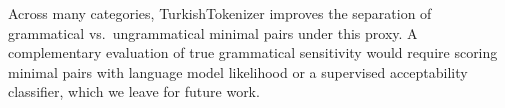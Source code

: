 \begin{table}[H]
\centering
\caption{TurBLiMP centroid-based pairwise accuracy by linguistic phenomenon.}
\label{tab:turblimp_detailed}
\resizebox{\linewidth}{!}{

}
\end{table}

Across many categories, TurkishTokenizer improves the separation of grammatical vs.\ ungrammatical minimal pairs under this proxy. A complementary evaluation of true grammatical sensitivity would require scoring minimal pairs with language model likelihood or a supervised acceptability classifier, which we leave for future work.

\FloatBarrier
